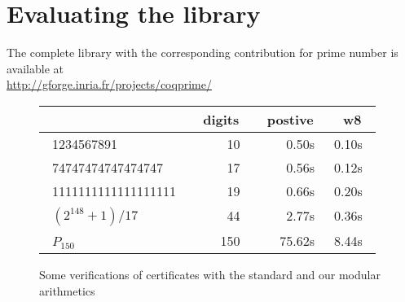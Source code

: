 \section{Evaluating the library \label{bench}}

The complete library with the corresponding contribution for prime number is available at\\
\url{http://gforge.inria.fr/projects/coqprime/}\\
\begin{figure}[ht]
\begin{center}
\begin{tabular}{|l|r| r|r|}
\hline
 & ~digits~ & ~postive~ & ~w8~ \\
\hline
~1234567891       ~  & 10~  & 0.50s~  & 0.10s~  \\
~74747474747474747~  & 17~ & 0.56s~  & 0.12s~  \\
~1111111111111111111~ & 19~ & 0.66s~ & 0.20s~  \\
~$(2^{148}+1)/17$ ~   & 44~ & 2.77s~  & 0.36s~  \\
~$P_{150}$   ~       & 150~ & 75.62s~  & 8.44s~  \\
\hline
\end{tabular}
\end{center}
\caption{Some verifications of certificates with the standard and our modular arithmetics}
\label{fig:TimeCompW}
\end{figure} 

